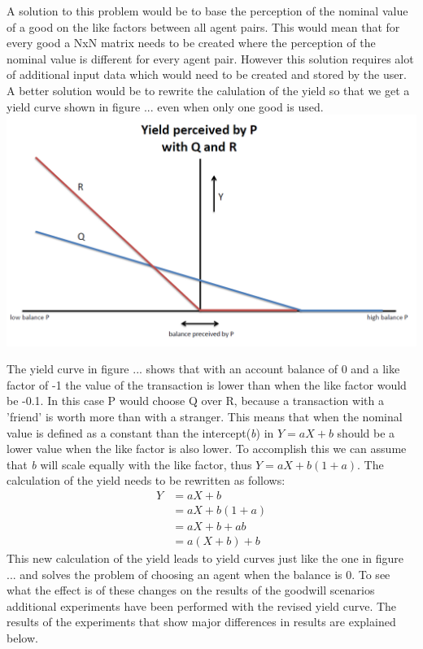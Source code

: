 \documentclass[twoside,openright]{uva-bachelor-thesis}
\begin{document}
A solution to this problem would be to base the perception of the nominal value of a good on the like factors between all agent pairs. This would mean that for every good a NxN matrix needs to be created where the perception of the nominal value is different for every agent pair. However this solution requires alot of additional input data which would need to be created and stored by the user. A better solution would be to rewrite the calulation of the yield so that we get a yield curve shown in figure ... even when only one good is used. \\
\includegraphics[scale=0.4]{YieldCurves/yieldcurve_P_QR2}

The yield curve in figure ... shows that with an account balance of 0 and a like factor of -1 the value of the transaction is lower than when the like factor would be -0.1. In this case P would choose Q over R, because a transaction with a 'friend' is worth more than with a stranger. This means that when the nominal value is defined as a constant than the intercept(\textit{b}) in \textit{$Y = aX + b$} should be a lower value when the like factor is also lower. To accomplish this we can assume that \textit{b} will scale equally with the like factor, thus \textit{$Y = aX + b(1 + a)$}.  The calculation of the yield needs to be rewritten as follows:
\begin{equation}
\begin{split}
  Y & = aX + b \\
     & = aX + b(1 + a) \\
     & = aX + b + ab \\
     & = a(X + b) + b 
\end{split}
\end{equation}
This new calculation of the yield leads to yield curves just like the one in figure ... and solves the problem of choosing an agent when the balance is 0. To see what the effect is of these changes on the results of the goodwill scenarios additional experiments have been performed with the revised yield curve. The results of the experiments that show major differences in results are explained below.
\end{document}
